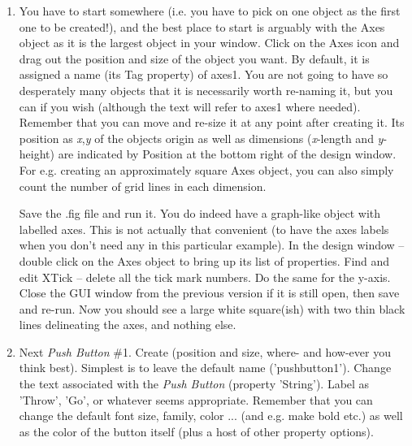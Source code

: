 \documentclass{tufte-book} %
\begin{document}
\begin{enumerate}
\setlength{\itemindent}{.2in}

\item You have to start somewhere (i.e. you have to pick on one object as the first one to be created!), and the best place to start is arguably with the \textsf{Axes} object as it is the largest object in your window. Click on the \textsf{Axes} icon and drag out the position and size of the object you want. By default, it is assigned a name (its \textsf{Tag} property) of \textsf{axes1}. You are not going to have so desperately many objects that it is necessarily worth re-naming it, but you can if you wish (although the text will refer to \textsf{axes1} where needed). Remember that you can move and re-size it at any point after creating it. Its position as \textit{x},\textit{y} of the objects origin as well as dimensions (\textit{x}-length and \textit{y}-height) are indicated by \textsf{Position} at the bottom right of the design window. For e.g. creating an approximately square \textsf{Axes} object, you can also simply count the number of grid lines in each dimension.

Save the \textsf{.fig} file and run it. You do indeed have a graph-like object with labelled axes. This is not actually that convenient (to have the axes labels when you don't need any in this particular example). In the design window -- double
click on the \textsf{Axes} object to bring up its list of properties. Find and edit \textsf{XTick} -- delete all the tick mark numbers. Do the same for the y-axis. Close the GUI window from the previous version if it is still open, then save and re-run. Now you should see a large white square(ish) with two thin black lines delineating the axes, and nothing else.

\item Next \textit{Push Button} \#1. Create (position and size, where- and how-ever you think best). Simplest is to leave the default name ('\textsf{pushbutton}1'). Change the text associated with the \textit{Push Button} (property '\textsf{String}'). Label as 'Throw', 'Go', or whatever seems appropriate. Remember that you can change the default font size, family, color ... (and e.g. make bold etc.) as well as the color of the button itself (plus a host of other property options).


\end{enumerate}
\end{document}
